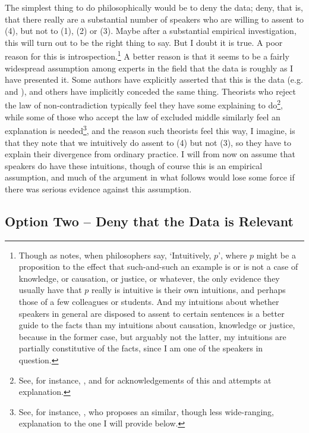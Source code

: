 The simplest thing to do philosophically would be to deny the data; deny, that is, that there really are a substantial number of speakers who are willing to assent to (4), but not to (1), (2) or (3). Maybe after a substantial empirical investigation, this will turn out to be the right thing to say. But I doubt it is true. A poor reason for this is introspection.\footnote{Though as \cite[37]{Jackson1998} notes, when philosophers say, `Intuitively, \(p\)', where \(p\) might be a proposition to the effect that such-and-such an example is or is not a case of knowledge, or causation, or justice, or whatever, the only evidence they usually have that \(p\) really is intuitive is their own intuitions, and perhaps those of a few colleagues or students. And my intuitions about whether speakers in general are disposed to assent to certain sentences is a better guide to the facts than my intuitions about causation, knowledge or justice, because in the former case, but arguably not the latter, my intuitions are partially constitutive of the facts, since I am one of the speakers in question.} A better reason is that it seems to be a fairly widespread assumption among experts in the field that the data is roughly as I have presented it. Some authors have explicitly asserted that this is the data (e.g. \citet{Burgess1987} and \citet{Tappenden1993}), and others have implicitly conceded the same thing. Theorists who reject the law of non-contradiction typically feel they have some explaining to do\footnote{See, for instance, \cite[183-5]{Machina1976}, \cite[194]{Tye1994} and \cite[71]{Parsons2000} for acknowledgements of this and attempts at explanation.}, while some of those who accept the law of excluded middle similarly feel an explanation is needed\footnote{See, for instance, \cite[164]{Keefe2000}, who proposes an similar, though less wide-ranging, explanation to the one I will provide below.}, and the reason such theorists feel this way, I imagine, is that they note that we intuitively do assent to (4) but not (3), so they have to explain their divergence from ordinary practice. I will from now on assume that speakers do have these intuitions, though of course this is an empirical assumption, and much of the argument in what follows would lose some force if there was serious evidence against this assumption.

\subsection*{Option Two -- Deny that the Data is Relevant}

